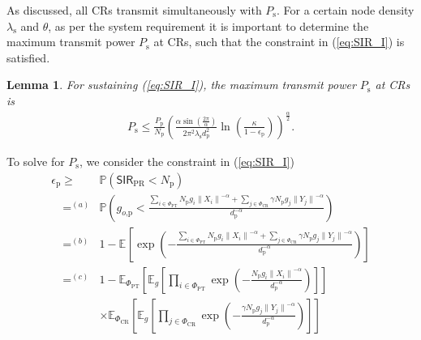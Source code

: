 \documentclass[conference, twocolumn]{IEEEtran}
\newcommand{\e}[2]{{\mathbb E}_{#1}\left[ #2 \right]}
\newcommand{\p}{\mathbb P}
\newcommand{\sub}[1]{_{\text{#1}}}
\DeclareMathOperator*{\gthan}{\ge}
\DeclareMathOperator*{\eqto}{=}
\newtheorem{lemma}{Lemma}
\begin{document}
As discussed, all CRs transmit simultaneously with $P\sub{s}$. For a certain node density $\lambda\sub{s}$ and $\theta$, as per the system requirement it is important to determine the maximum transmit power $P\sub{s}$ at CRs, such that the constraint in (\ref{eq:SIR_I}) is satisfied. 
\begin{lemma}\label{lem:lemma2}
\normalfont 
For sustaining (\ref{eq:SIR_I}), the maximum transmit power $P\sub{s}$ at CRs is 
\begin{align}
P\sub{s} \le \frac{P\sub{p}}{N\sub{p}} \left( \frac{\alpha \sin \left( \frac{2 \pi}{\alpha} \right)}{2 \pi^2 \lambda\sub{s} d\sub{p}^{2}  } \ln \left( \frac{\kappa}{1 - \epsilon\sub{p}} \right) \right)^{\frac{\alpha}{2}}.
\label{eq:tpCR}
\end{align} 
\end{lemma}
\begin{IEEEproof}
To solve for $P\sub{s}$, we consider the constraint in (\ref{eq:SIR_I}) 
\begin{align}
\epsilon_{\text{p}} \gthan{\text{}}& \p \left( \textsf{SIR}\sub{PR}  < N\sub{p} \right) \nonumber \\ 
\quad \eqto^{(a)}& \p \left( g\sub{$o$,p} < \frac{\sum\limits_{i \in \Phi_{\text{PT}}} N\sub{p} g_i {\|X_i\|}^{-\alpha} +  \sum\limits_{j \in \Phi_{\text{CR}}} \gamma N\sub{p} g_j {\|Y_j\|}^{-\alpha}}{d\sub{p}^{-\alpha}} \right) \nonumber \\ 
\quad \eqto^{(b)}& 1 - \e{\mathsf{}}{\exp \left(- \frac{\sum\limits_{i \in \Phi_{\text{PT}}} N\sub{p} g_i {\|X_i\|}^{-\alpha} +  \sum\limits_{j \in \Phi_{\text{CR}}} \gamma N\sub{p} g_j {\|Y_j\|}^{-\alpha}}{d\sub{p}^{-\alpha}}  \right)} \nonumber \\
\quad \eqto^{(c)}& 1 - \e{ \Phi_{\text{PT}} } {\e{g} { \prod\limits_{i \in \Phi_{\text{PT}}} \exp\left(- \frac{N\sub{p} g_i {\|X_i\|}^{-\alpha}}{d\sub{p}^{-\alpha}} \right) } } \nonumber \\ 
\quad & \times \e{ \Phi_{\text{CR}} } { \e{g} { \prod\limits_{j \in \Phi_{\text{CR}}} \exp \left( - \frac{\gamma N\sub{p} g_j {\|Y_j\|}^{-\alpha}}{d\sub{p}^{-\alpha}} \right) }} \nonumber \\ 

\end{align}
\end{IEEEproof}
\end{document}
